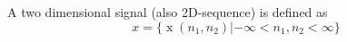 A two dimensional signal (also 2D-sequence) is defined as
$$x = \{ \operatorname{x}(n_1, n_2) | -\infty < n_1, n_2 < \infty \}$$
